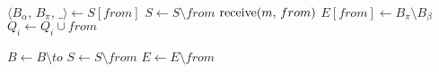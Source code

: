 {  \begin{multicols}{2}
    \EmptyComment*{}
    \EmptyComment*{}
    \EmptyComment*{}
    \columnbreak
   {
    $\langle B_\alpha,\, B_\pi,\, \_ \rangle \leftarrow S[from]$ \;
    $S \leftarrow S \setminus from$ \;
    {$\textup{receive}(m,\,from)$ \label{line:todeliver}}  %
    $E[from] \leftarrow B_\pi \setminus B_\beta$ \label{line:toexpect} \;%
    $Q_i \leftarrow Q_i \cup from$ \; %
  }
  \end{multicols}
  \BlankLine
  
  \begin{multicols}{2}
   {
    $B \leftarrow B \setminus to$
  }
   {
    $S \leftarrow S \setminus from$ \;
    $E \leftarrow E \setminus from$
  }
  \end{multicols}
  \BlankLine
}


